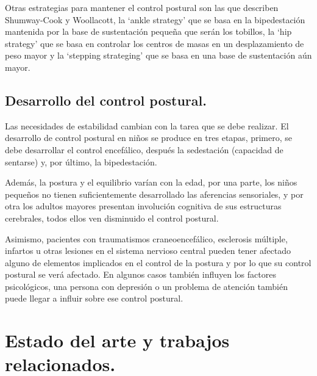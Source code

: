 Otras estrategias para mantener el control postural son las que describen Shumway-Cook y Woollacott, la ‘ankle strategy’ que se basa en la bipedestación mantenida por la base de sustentación pequeña que serán los tobillos, la ‘hip strategy’ que se basa en controlar los centros de masas en un desplazamiento de peso mayor y la ‘stepping strateging’ que se basa en una base de sustentación aún mayor.

\subsection{Desarrollo del control postural.} 
Las necesidades de estabilidad cambian con la tarea que se debe realizar. El desarrollo de control postural en niños se produce en tres etapas, primero, se debe desarrollar el control encefálico, después la sedestación (capacidad de sentarse) y, por último, la bipedestación.

Además, la postura y el equilibrio varían con la edad, por una parte, los niños pequeños\cite{Libro3_pediatria} no tienen suficientemente desarrollado las aferencias sensoriales, y por otra los adultos mayores\cite{Libro4_mayores} presentan involución cognitiva de sus estructuras cerebrales, todos ellos ven disminuido el control postural.

Asimismo, pacientes con traumatismos craneoencefálico, esclerosis múltiple, infartos u otras lesiones en el sistema nervioso central pueden tener afectado alguno de elementos implicados en el control de la postura y por lo que su control postural se verá afectado. En algunos casos también influyen los factores psicológicos, una persona con depresión o un problema de atención también puede llegar a influir sobre ese control postural.


\section{Estado del arte y trabajos relacionados.}

